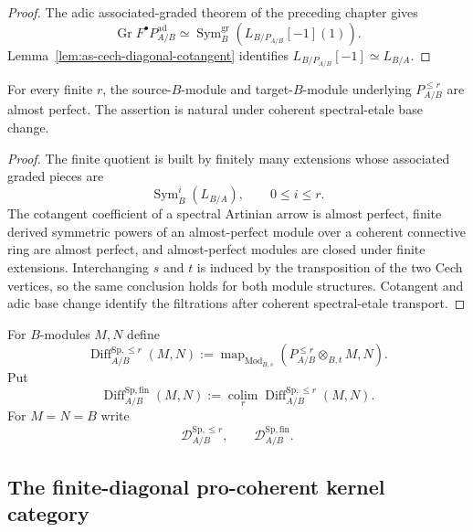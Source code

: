 \begin{proof}
The adic associated-graded theorem of the preceding chapter gives
\[
    \operatorname{Gr}
    F^\bullet P_{A/B}^{\mathrm{ad}}
    \simeq
    \operatorname{Sym}^{\mathrm{gr}}_B
    \left(
        L_{B/P_{A/B}}[-1](1)
    \right).
\]
Lemma~\ref{lem:as-cech-diagonal-cotangent} identifies
$L_{B/P_{A/B}}[-1]\simeq L_{B/A}$.
\end{proof}

\begin{proposition}
\label{prop:as-finite-principal-parts-aperf}
For every finite $r$, the source-$B$-module and target-$B$-module underlying
$P_{A/B}^{\le r}$ are almost perfect.  The assertion is natural under
coherent spectral-etale base change.
\end{proposition}

\begin{proof}
The finite quotient is built by finitely many extensions whose associated
graded pieces are
\[
    \operatorname{Sym}_B^i(L_{B/A}),
    \qquad 0\le i\le r.
\]
The cotangent coefficient of a spectral Artinian arrow is almost perfect,
finite derived symmetric powers of an almost-perfect module over a coherent
connective ring are almost perfect, and almost-perfect modules are closed
under finite extensions.  Interchanging $s$ and $t$ is induced by the
transposition of the two Cech vertices, so the same conclusion holds for
both module structures.  Cotangent and adic base change identify the
filtrations after coherent spectral-etale transport.
\end{proof}

\begin{definition}
\label{def:as-finite-order-spencer-operators}
For $B$-modules $M,N$ define
\[
\boxed{
    \operatorname{Diff}_{A/B}^{\mathrm{Sp},\le r}(M,N)
    :=
    \operatorname{map}_{\operatorname{Mod}_{B,s}}
    \left(
        P_{A/B}^{\le r}
        \otimes_{B,t}M,
        N
    \right).
}
\]
Put
\[
    \operatorname{Diff}_{A/B}^{\mathrm{Sp,fin}}(M,N)
    :=
    \operatorname*{colim}_r
    \operatorname{Diff}_{A/B}^{\mathrm{Sp},\le r}(M,N).
\]
For $M=N=B$ write
\[
    \mathcal D_{A/B}^{\mathrm{Sp},\le r},
    \qquad
    \mathcal D_{A/B}^{\mathrm{Sp,fin}}.
\]
\end{definition}

\subsection{The finite-diagonal pro-coherent kernel category}

